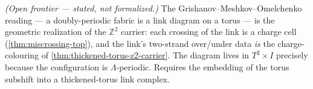 \begin{theorem}\label{thm:textile-link-on-torus}\notready{}
\emph{(Open frontier --- stated, not formalized.)} The Grishanov--Meshkov--Omelchenko
reading --- a doubly-periodic fabric is a link diagram on a torus --- is the geometric
realization of the $\mathbb{Z}^2$ carrier: each crossing of the link is a charge cell
(\cref{thm:miscrossing-top}), and the link's two-strand over/under data \emph{is} the
charge-colouring of \cref{thm:thickened-torus-z2-carrier}. The diagram lives in $T^2\times I$
precisely because the configuration is $\Lambda$-periodic. Requires the embedding of the
torus subshift into a thickened-torus link complex.
\end{theorem}
